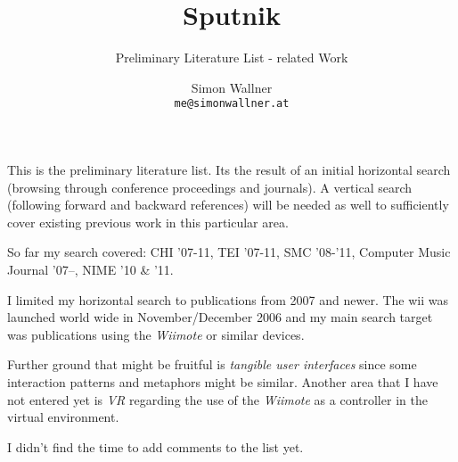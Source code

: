 \documentclass[10pt,a4paper]{scrartcl}
\author{Simon Wallner\\\texttt{me@simonwallner.at}}
\title{Sputnik}
\subtitle{Preliminary Literature List - related Work}
\begin{document}
\maketitle

This is the preliminary literature list. Its the result of an initial horizontal search (browsing through conference proceedings and journals). A vertical search (following forward and backward references) will be needed as well to sufficiently cover existing previous work in this particular area.

So far my search covered: CHI '07-11, TEI '07-11, SMC '08-'11, Computer Music Journal '07--, NIME '10 \& '11.

I limited my horizontal search to publications from 2007 and newer. The wii was launched world wide in November/December 2006 and my main search target was publications using the \emph{Wiimote} or similar devices. 

Further ground that might be fruitful is \emph{tangible user interfaces} since some interaction patterns and metaphors might be similar. Another area that I have not entered yet is \emph{VR} regarding the use of the \emph{Wiimote} as a controller in the virtual environment.

I didn't find the time to add comments to the list yet.

\nocite{*}



\end{document}

